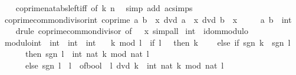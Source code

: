 \begin{isabellebody}
%
\isadelimproof
\ \ %
\endisadelimproof
%
\isatagproof
{}\isamarkupfalse%
\ coprime{\isacharunderscore}{\kern0pt}nat{\isacharunderscore}{\kern0pt}abs{\isacharunderscore}{\kern0pt}left{\isacharunderscore}{\kern0pt}iff\ {\isacharbrackleft}{\kern0pt}of\ k\ n{\isacharbrackright}{\kern0pt}\ \isamarkupfalse%
\ {\isacharparenleft}{\kern0pt}simp\ add{\isacharcolon}{\kern0pt}\ ac{\isacharunderscore}{\kern0pt}simps{\isacharparenright}{\kern0pt}%
\endisatagproof
{\isafoldproof}%
%
\isadelimproof
\isanewline
%
\endisadelimproof
\isanewline
{}\isamarkupfalse%
\ coprime{\isacharunderscore}{\kern0pt}common{\isacharunderscore}{\kern0pt}divisor{\isacharunderscore}{\kern0pt}int{\isacharcolon}{\kern0pt}\ {\isachardoublequoteopen}coprime\ a\ b\ {\isasymLongrightarrow}\ x\ dvd\ a\ {\isasymLongrightarrow}\ x\ dvd\ b\ {\isasymLongrightarrow}\ {\isasymbar}x{\isasymbar}\ {\isacharequal}{\kern0pt}\ {}{\isachardoublequoteclose}\isanewline
\ \ \ a\ b\ {\isacharcolon}{\kern0pt}{\isacharcolon}{\kern0pt}\ int\isanewline
%
\isadelimproof
\ \ %
\endisadelimproof
%
\isatagproof
{}\isamarkupfalse%
\ {\isacharparenleft}{\kern0pt}drule\ coprime{\isacharunderscore}{\kern0pt}common{\isacharunderscore}{\kern0pt}divisor\ {\isacharbrackleft}{\kern0pt}of\ {\isacharunderscore}{\kern0pt}\ {\isacharunderscore}{\kern0pt}\ x{\isacharbrackright}{\kern0pt}{\isacharparenright}{\kern0pt}\ simp{\isacharunderscore}{\kern0pt}all%
\endisatagproof
{\isafoldproof}%
%
\isadelimproof
\isanewline
%
\endisadelimproof
\isanewline
{}\isamarkupfalse%
\ int\ {\isacharcolon}{\kern0pt}{\isacharcolon}{\kern0pt}\ idom{\isacharunderscore}{\kern0pt}modulo\isanewline
{}\isanewline
\isanewline
{}\isamarkupfalse%
\ modulo{\isacharunderscore}{\kern0pt}int\ {\isacharcolon}{\kern0pt}{\isacharcolon}{\kern0pt}\ {\isachardoublequoteopen}int\ {\isasymRightarrow}\ int\ {\isasymRightarrow}\ int{\isachardoublequoteclose}\isanewline
\ \ \ {\isachardoublequoteopen}k\ mod\ l\ {\isacharequal}{\kern0pt}\ {\isacharparenleft}{\kern0pt}if\ l\ {\isacharequal}{\kern0pt}\ {}\ then\ k\isanewline
\ \ \ \ else\ if\ sgn\ k\ {\isacharequal}{\kern0pt}\ sgn\ l\isanewline
\ \ \ \ \ \ then\ sgn\ l\ {\isacharasterisk}{\kern0pt}\ int\ {\isacharparenleft}{\kern0pt}nat\ {\isasymbar}k{\isasymbar}\ mod\ nat\ {\isasymbar}l{\isasymbar}{\isacharparenright}{\kern0pt}\isanewline
\ \ \ \ \ \ else\ sgn\ l\ {\isacharasterisk}{\kern0pt}\ {\isacharparenleft}{\kern0pt}{\isasymbar}l{\isasymbar}\ {\isacharasterisk}{\kern0pt}\ of{\isacharunderscore}{\kern0pt}bool\ {\isacharparenleft}{\kern0pt}{\isasymnot}\ l\ dvd\ k{\isacharparenright}{\kern0pt}\ {\isacharminus}{\kern0pt}\ int\ {\isacharparenleft}{\kern0pt}nat\ {\isasymbar}k{\isasymbar}\ mod\ nat\ {\isasymbar}l{\isasymbar}{\isacharparenright}{\kern0pt}{\isacharparenright}{\kern0pt}{\isacharparenright}{\kern0pt}{\isachardoublequoteclose}\isanewline

\end{isabellebody}
